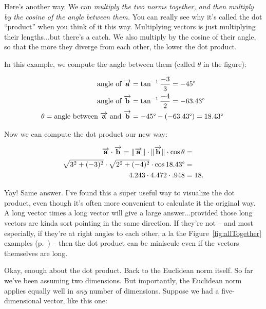 Here's another way. We can \textit{multiply the two norms together, and then
multiply by the cosine of the angle between them.} You can really see why it's
called the dot ``product'' when you think of it this way. Multiplying vectors
is just multiplying their lengths...but there's a catch. We also multiply by
the cosine of their angle, so that the more they diverge from each other, the
lower the dot product.

In this example, we compute the angle between them (called $\theta$ in the
figure):

\vspace{-.2in}
\begin{align*}
\textrm{angle of } \overrightarrow{\textbf{a}} &= \tan^{-1} \frac{-3}{3} =
-45\degree\ \\
\textrm{angle of } \overrightarrow{\textbf{b}} &= \tan^{-1} \frac{-4}{2} =
-63.43\degree\ \\ 
\theta = \textrm{angle between } \overrightarrow{\textbf{a}} \textrm{ and }
\overrightarrow{\textbf{b}} &= -45\degree - (-63.43\degree) = 18.43\degree\ \\
\end{align*}

Now we can compute the dot product our new way:

\vspace{-.15in}
\begin{align*}
\overrightarrow{\textbf{a}} \cdot \overrightarrow{\textbf{b}} = 
\lVert\overrightarrow{\textbf{a}}\rVert \cdot \lVert\overrightarrow{\textbf{b}}\rVert
\cdot \cos
\theta &= \\
\sqrt{3^2+(-3)^2} \cdot \sqrt{2^2+(-4)^2} \cdot \cos 18.43\degree &= \\
4.243 \cdot 4.472 \cdot .948 & = 18. \\
\end{align*}

Yay! Same answer. I've found this a super useful way to visualize the dot
product, even though it's often more convenient to calculate it the original
way. A long vector times a long vector will give a large answer...provided
those long vectors are kinda sort pointing in the same direction. If they're
not -- and most especially, if they're at right angles to each other, a la the
Figure~\ref{fig:allTogether} examples (p.~\pageref{fig:allTogether}) -- then
the dot product can be miniscule even if the vectors themselves are long.

\bigskip

Okay, enough about the dot product. Back to the Euclidean norm itself. So far
we've been assuming two dimensions. But importantly, the Euclidean norm applies
equally well in \textit{any} number of dimensions. Suppose we had a
five-dimensional vector, like this one:

